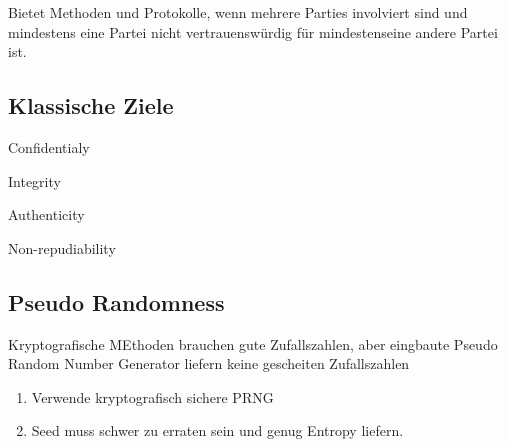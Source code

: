 Bietet Methoden und Protokolle, wenn mehrere Parties involviert sind und mindestens eine Partei
nicht vertrauenswürdig für mindestenseine andere Partei ist.

\subsection{Klassische Ziele}
\begin{compactitem}
    \item Confidentialy
    \item Integrity
    \item Authenticity
    \item Non-repudiability
\end{compactitem}

\subsection{Pseudo Randomness}
Kryptografische MEthoden brauchen gute Zufallszahlen, aber eingbaute Pseudo Random Number Generator liefern
keine gescheiten Zufallszahlen
\begin{enumerate}
    \item Verwende kryptografisch sichere PRNG
    \item Seed muss schwer zu erraten sein und genug Entropy liefern.

\end{enumerate}
